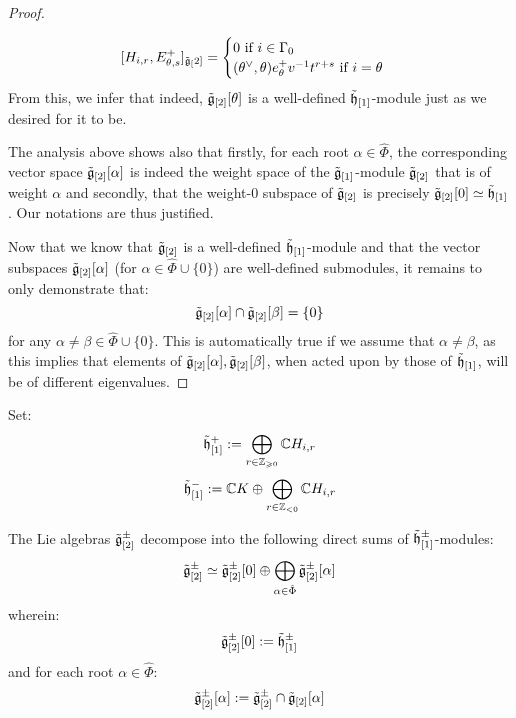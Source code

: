 \begin{proof}
\begin{itemize}
                        $$
                            [H_{i, r}, E_{\theta, s}^+]_{\tilde{\mathfrak{g}}_[2]}
                            =
                            \begin{cases}
                                \text{$0$ if $i \in \Gamma_0$}
                                \\
                                \text{$(\theta^{\vee}, \theta) e_{\theta}^+ v^{-1} t^{r + s}$ if $i = \theta$}
                            \end{cases}
                        $$
                    From this, we infer that indeed, $\tilde{\mathfrak{g}}_{[2]}[\theta]$ is a well-defined $\tilde{\mathfrak{h}}_{[1]}$-module just as we desired for it to be. 
                \end{itemize}

                The analysis above shows also that firstly, for each root $\alpha \in \hat{\Phi}$, the corresponding vector space $\tilde{\mathfrak{g}}_{[2]}[\alpha]$ is indeed the weight space of the $\tilde{\mathfrak{g}}_{[1]}$-module $\tilde{\mathfrak{g}}_{[2]}$ that is of weight $\alpha$ and secondly, that the weight-$0$ subspace of $\tilde{\mathfrak{g}}_{[2]}$ is precisely $\tilde{\mathfrak{g}}_{[2]}[0] \simeq \tilde{\mathfrak{h}}_{[1]}$. Our notations are thus justified. 

                Now that we know that $\tilde{\mathfrak{g}}_{[2]}$ is a well-defined $\tilde{\mathfrak{h}}_{[1]}$-module and that the vector subspaces $\tilde{\mathfrak{g}}_{[2]}[\alpha]$ (for $\alpha \in \hat{\Phi} \cup \{0\}$) are well-defined submodules, it remains to only demonstrate that:
                    $$\tilde{\mathfrak{g}}_{[2]}[\alpha] \cap \tilde{\mathfrak{g}}_{[2]}[\beta] = \{0\}$$
                for any $\alpha \not = \beta \in \hat{\Phi} \cup \{0\}$. This is automatically true if we assume that $\alpha \not = \beta$, as this implies that elements of $\tilde{\mathfrak{g}}_{[2]}[\alpha], \tilde{\mathfrak{g}}_{[2]}[\beta]$, when acted upon by those of $\tilde{\mathfrak{h}}_{[1]}$, will be of different eigenvalues.
            \end{proof}
        \begin{corollary}
            Set:
                $$\tilde{\mathfrak{h}}_{[1]}^+ := \bigoplus_{r \in \mathbb{Z}_{\geqslant 0}} \mathbb{C} H_{i, r}$$
                $$\tilde{\mathfrak{h}}_{[1]}^- := \mathbb{C} K \oplus \bigoplus_{r \in \mathbb{Z}_{< 0}} \mathbb{C} H_{i, r}$$
        
            The Lie algebras $\tilde{\mathfrak{g}}_{[2]}^{\pm}$ decompose into the following direct sums of $\tilde{\mathfrak{h}}_{[1]}^{\pm}$-modules:
                $$\tilde{\mathfrak{g}}_{[2]}^{\pm} \simeq \tilde{\mathfrak{g}}_{[2]}^{\pm}[0] \oplus \bigoplus_{\alpha \in \hat{\Phi}} \tilde{\mathfrak{g}}_{[2]}^{\pm}[\alpha]$$
            wherein:
                $$\tilde{\mathfrak{g}}_{[2]}^{\pm}[0] := \tilde{\mathfrak{h}}_{[1]}^{\pm}$$
            and for each root $\alpha \in \hat{\Phi}$:
                $$\tilde{\mathfrak{g}}_{[2]}^{\pm}[\alpha] := \tilde{\mathfrak{g}}_{[2]}^{\pm} \cap \tilde{\mathfrak{g}}_{[2]}[\alpha]$$
        \end{corollary}
